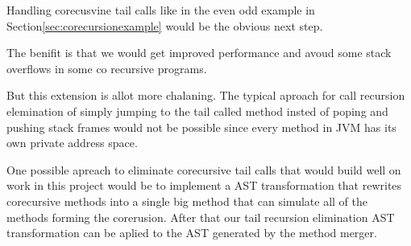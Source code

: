 Handling corecusvine tail calls like in the even odd example in Section\ref{sec:corecursionexample} would be the obvious next step.

The benifit is that we would get improved performance and avoud some stack overflows in some co recursive programs.

But this extension is allot more chalaning. The typical aproach for call recursion elemination of simply jumping to the tail called method insted of poping and pushing stack frames would not be possible since every method in JVM has its own private address space.

One possible apreach to eliminate corecursive tail calls that would build well on work in this project would be to implement a AST transformation that rewrites corecursive methods into a single big method that can simulate all of the methods forming the corerusion. After that our tail recursion elimination AST transformation can be aplied to the AST generated by the method merger.
